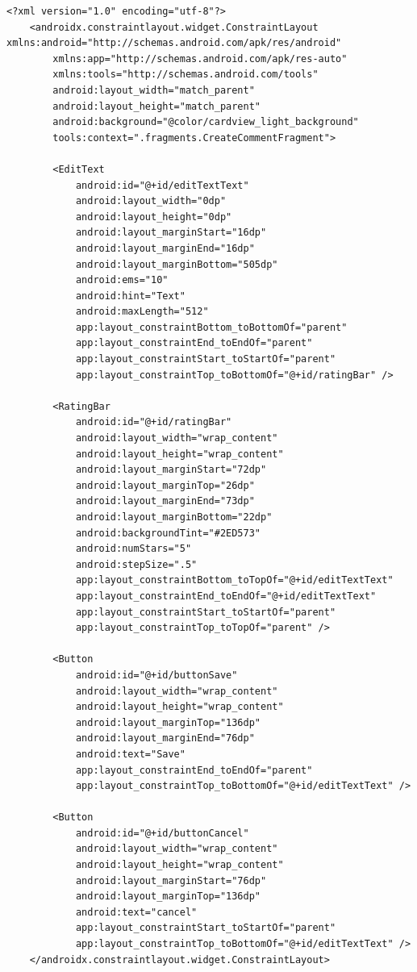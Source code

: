 \begin{lstlisting}[label=list:android_xml_create_comment,caption=Opis fragmentu tworzenia komentarza.,basicstyle=\tiny\ttfamily]
    <?xml version="1.0" encoding="utf-8"?>
    <androidx.constraintlayout.widget.ConstraintLayout xmlns:android="http://schemas.android.com/apk/res/android"
        xmlns:app="http://schemas.android.com/apk/res-auto"
        xmlns:tools="http://schemas.android.com/tools"
        android:layout_width="match_parent"
        android:layout_height="match_parent"
        android:background="@color/cardview_light_background"
        tools:context=".fragments.CreateCommentFragment">
    
        <EditText
            android:id="@+id/editTextText"
            android:layout_width="0dp"
            android:layout_height="0dp"
            android:layout_marginStart="16dp"
            android:layout_marginEnd="16dp"
            android:layout_marginBottom="505dp"
            android:ems="10"
            android:hint="Text"
            android:maxLength="512"
            app:layout_constraintBottom_toBottomOf="parent"
            app:layout_constraintEnd_toEndOf="parent"
            app:layout_constraintStart_toStartOf="parent"
            app:layout_constraintTop_toBottomOf="@+id/ratingBar" />
    
        <RatingBar
            android:id="@+id/ratingBar"
            android:layout_width="wrap_content"
            android:layout_height="wrap_content"
            android:layout_marginStart="72dp"
            android:layout_marginTop="26dp"
            android:layout_marginEnd="73dp"
            android:layout_marginBottom="22dp"
            android:backgroundTint="#2ED573"
            android:numStars="5"
            android:stepSize=".5"
            app:layout_constraintBottom_toTopOf="@+id/editTextText"
            app:layout_constraintEnd_toEndOf="@+id/editTextText"
            app:layout_constraintStart_toStartOf="parent"
            app:layout_constraintTop_toTopOf="parent" />
    
        <Button
            android:id="@+id/buttonSave"
            android:layout_width="wrap_content"
            android:layout_height="wrap_content"
            android:layout_marginTop="136dp"
            android:layout_marginEnd="76dp"
            android:text="Save"
            app:layout_constraintEnd_toEndOf="parent"
            app:layout_constraintTop_toBottomOf="@+id/editTextText" />
    
        <Button
            android:id="@+id/buttonCancel"
            android:layout_width="wrap_content"
            android:layout_height="wrap_content"
            android:layout_marginStart="76dp"
            android:layout_marginTop="136dp"
            android:text="cancel"
            app:layout_constraintStart_toStartOf="parent"
            app:layout_constraintTop_toBottomOf="@+id/editTextText" />
    </androidx.constraintlayout.widget.ConstraintLayout>
\end{lstlisting}
